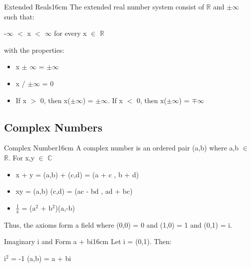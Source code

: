 	\begin{definition}{Extended Reals}{16cm}
		The {\color{lblue} extended real number system} consist of $\mathbb{R}$
		and $\pm$$\infty$ such that:

		\hspace{0.5cm}
		-$\infty$ $<$ x $<$ $\infty$ \hspace{1cm} for every x $\in$ $\mathbb{R}$

		with the properties:
		\begin{itemize}[leftmargin=1cm, itemsep=0.1cm]
			\item x $\pm$ $\infty$ = $\pm$$\infty$
		
			\item x / $\pm$$\infty$ = 0

			\item If x $>$ 0, then x($\pm$$\infty$) = $\pm$$\infty$.
				If x $<$ 0, then x($\pm$$\infty$) = $\mp$$\infty$
		\end{itemize}	
	\end{definition}

	\vspace{0.5cm}





\subsection{ Complex Numbers }

	\begin{definition}{Complex Number}{16cm}
		A complex number is an ordered pair (a,b) where a,b $\in$ $ \mathbb{R} $.
		For x,y $\in$ $\mathbb{C}$

		\begin{itemize}[leftmargin=1cm, itemsep=0.1cm]
			\item x + y = (a,b) + (c,d) = (a + c , b + d)
			\item xy = (a,b) (c,d) = (ac - bd , ad + bc)
			\item $\frac{1}{\text{x}}$  = (a$^2$ + b$^2$)(a,-b)
		\end{itemize}

		Thus, the axioms form a field where (0,0) = 0 and (1,0) = 1 and (0,1) = i.
	\end{definition}

	\vspace{0.5cm}



	\begin{wtheorem}{Imaginary i and Form a + bi}{16cm}
		Let i = (0,1). Then:
		
		\hspace{0.5cm}
		i$^2$ = -1
		\hspace{1cm}
		(a,b) = a + bi
	\end{wtheorem}

